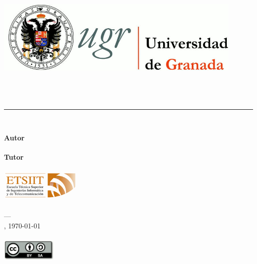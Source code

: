 \begin{titlepage}
\newlength{\centeroffset}
\setlength{\centeroffset}{-0.5\oddsidemargin}
\addtolength{\centeroffset}{0.5\evensidemargin}

\noindent\hspace*{\centeroffset}\begin{minipage}{\textwidth}

\centering
\includegraphics[width=0.9\textwidth]{../images/logo_ugr.png}\\[1.4cm]

\textsc{\Large\asunto\\[0.2cm]}
\textsc{\grado}\\[1cm]

{\Huge\bfseries \titulo\\}
\noindent\rule[-1ex]{\textwidth}{3pt}\\[3.5ex]
\end{minipage}

\vspace{2cm}
\noindent\hspace*{\centeroffset}\begin{minipage}{\textwidth}
\centering


\textbf{Autor}\\ {\autor}\\[2.5ex]
\textbf{Tutor}\\ {\tutor}\\[1cm]
\includegraphics[width=0.3\textwidth]{../images/logo_etsiit.png}\\[0.7cm]
\textsc{\escuela}\\
\textsc{---}\\
\ciudad, \today\\
\textsc{}\\[0.5cm]
\includegraphics[width=0.2\textwidth]{../images/CC-SA-logo.png}
\end{minipage}
\end{titlepage}
